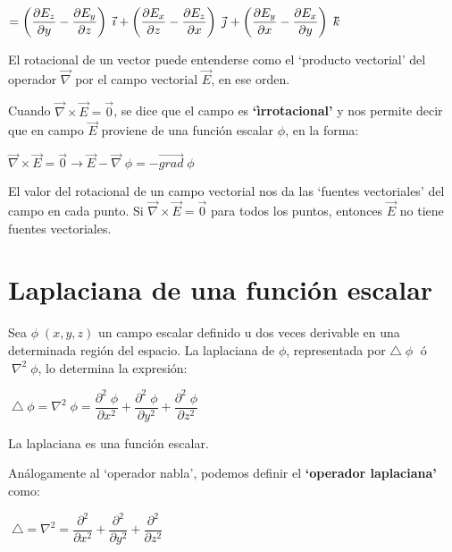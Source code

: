 $=\tiny{\left( \dfrac{\partial E_z}{\partial y} -\dfrac{\partial E_y}{\partial z} \right) \; \vec i + \left(\dfrac{\partial E_x}{\partial z} -\dfrac{\partial E_z}{\partial x} \right)\; \vec j+ \left(\dfrac{\partial E_y}{\partial x} -\dfrac{\partial E_x}{\partial y} \right)\; \vec k}$

\vspace{3mm}El rotacional de un vector puede entenderse como el `producto vectorial' del operador $\overrightarrow{\nabla}$ por el campo vectorial $\overrightarrow{E}$, en ese orden.

Cuando $\overrightarrow{\nabla} \times \overrightarrow {E}=\overrightarrow{0}$, se dice que el campo es \textbf{`ìrrotacional'} y nos permite decir que en campo $\overrightarrow {E}$ proviene de una función escalar $\phi$, en la forma:

$\overrightarrow{\nabla} \times \overrightarrow {E}=\overrightarrow{0} \longrightarrow \overrightarrow{E}-\overrightarrow{\nabla}\; \phi=-\overrightarrow{grad}\; \phi$

El valor del rotacional de un campo vectorial nos da las `fuentes vectoriales' del campo en cada punto. Si $\overrightarrow{\nabla} \times \overrightarrow {E}=\overrightarrow{0}$ para todos los puntos, entonces $\overrightarrow{E}$ no tiene fuentes vectoriales.

\section{Laplaciana de una función escalar}

Sea $\phi \; (x,y,z)$ un campo escalar definido u dos veces derivable en una determinada región del espacio. La laplaciana de $\phi$, representada por $\triangle\; \phi \;$ ó $\; \nabla^2 \; \phi$, lo determina la expresión:

\vspace{4mm}\centerline{$\boxed{\;\triangle\; \phi= \nabla^2 \; \phi =  \dfrac{\partial^2\; \phi}{\partial x^2}+\dfrac{\partial^2\; \phi}{\partial y^2}+\dfrac{\partial^2\; \phi}{\partial z^2} \;}$}

\vspace{3mm} La laplaciana es una función escalar.

Análogamente al `operador nabla', podemos definir el \textbf{`operador laplaciana'} como:


\vspace{4mm}\centerline{$\boxed {\;	\triangle = \nabla^2 = \dfrac {\partial^2}{\partial x^2}+ \dfrac {\partial^2}{\partial y^2}+\dfrac {\partial^2}{\partial z^2} \; }$}

